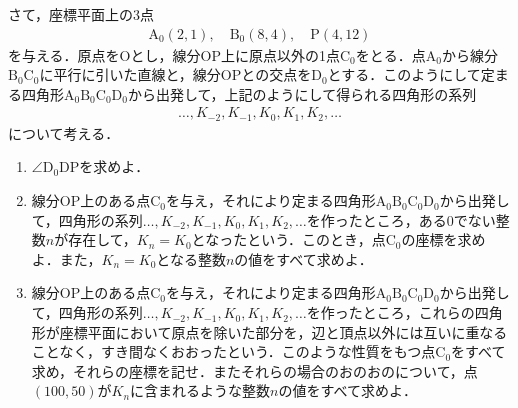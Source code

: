 \documentclass[unicode,12pt, A4j]{ltjsarticle}%
\begin{document}
さて，座標平面上の$3$点
\begin{align}
 \text{A}_0(2, 1), \quad \text{B}_0(8, 4), \quad \text{P}(4, 12) 
\end{align}
を与える．原点を$\text{O}$とし，線分$\text{OP}$上に原点以外の1点$\text{C}_0$をとる．点$\text{A}_0$から線分$\text{B}_0 \text{C}_0$に平行に引いた直線と，線分$\text{OP}$との交点を$\text{D}_0$とする．このようにして定まる四角形$\text{A}_0 \text{B}_0 \text{C}_0 \text{D}_0$から出発して，上記のようにして得られる四角形の系列
\begin{align}
 \dots, K_{-2}, K_{-1}, K_0, K_1, K_2, \dots 
\end{align}
について考える．
\begin{enumerate}
 \item $\angle \text{D}_0\text{D}\text{P}$を求めよ．
 \item 線分$\text{OP}$上のある点$\text{C}_0$を与え，それにより定まる四角形$\text{A}_0 \text{B}_0 \text{C}_0 \text{D}_0$から出発して，四角形の系列$\dots, K_{-2}, K_{-1}, K_0, K_1, K_2, \dots$を作ったところ，ある0でない整数$n$が存在して，$K_n = K_0$となったという．このとき，点$\text{C}_0$の座標を求めよ．また，$K_n = K_0$となる整数$n$の値をすべて求めよ．
 \item 線分$\text{OP}$上のある点$\text{C}_0$を与え，それにより定まる四角形$\text{A}_0 \text{B}_0 \text{C}_0 \text{D}_0$から出発して，四角形の系列$\dots, K_{-2}, K_{-1}, K_0, K_1, K_2, \dots$を作ったところ，これらの四角形が座標平面において原点を除いた部分を，辺と頂点以外には互いに重なることなく，すき間なくおおったという．このような性質をもつ点$\text{C}_0$をすべて求め，それらの座標を記せ．またそれらの場合のおのおのについて，点$(100, 50)$が$K_n$に含まれるような整数$n$の値をすべて求めよ．
\end{enumerate}

\begin{figure}[h]
\centering
\end{figure}
\end{document}
